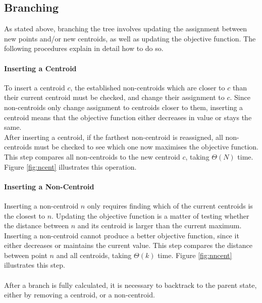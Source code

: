 \subsection{Branching}
As stated above, branching the tree involves updating the assignment between new points and/or new centroids, as well as updating the objective function. The following procedures explain in detail how to do so.
\paragraph{Inserting a Centroid}
To insert a centroid $c$, the established non-centroids which are closer to $c$ than their current centroid must be checked, and change their assignment to $c$.
Since non-centroids only change assignment to centroids closer to them, inserting a centroid means that the objective function either decreases in value or stays the same.\\
After inserting a centroid, if the farthest non-centroid is reassigned, all non-centroids must be checked to see which one now maximises the objective function.
This step compares all non-centroids to the new centroid $c$, taking $\Theta(N)$ time. Figure \ref{fig:ncent} illustrates this operation.



\paragraph{Inserting a Non-Centroid}
Inserting a non-centroid $n$ only requires finding which of the current centroids is the closest to $n$. Updating the objective function is a matter of testing whether the distance between $n$ and its centroid is larger than the current maximum.
Inserting a non-centroid cannot produce a better objective function, since it either decreases or maintains the current value. 
This step compares the distance between point $n$ and all centroids, taking $\Theta(k)$ time. Figure \ref{fig:nncent} illustrates this step.



\paragraph{}
After a branch is fully calculated, it is necessary to backtrack to the parent state, either by removing a centroid, or a non-centroid.

